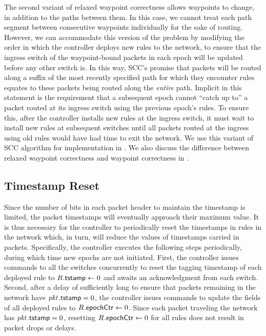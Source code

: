 The second variant of relaxed waypoint correctness allows waypoints to change,
in addition to the paths between them.  In this case,
we cannot treat each path segment between consecutive waypoints
individually for the sake of routing.  However, we can accommodate
this version of the problem by modifying the order in which the
controller deploys new rules to the network, to ensure that the
ingress switch of the waypoint-bound packets in each epoch will be
updated before any other switch is.  In this way, SCC's promise that
packets will be routed along a suffix of the most recently specified path
for which they encounter rules equates to these packets being routed
along the \textit{entire} path.  Implicit in this statement is the
requirement that a subsequent epoch cannot ``catch up to'' a packet
routed at its ingress switch using the previous epoch's rules.  To
ensure this, after the controller installs new rules at the ingress
switch, it must wait to install new rules at subsequent switches until
all packets routed at the ingress using old rules would have had time
to exit the network. We use this variant of SCC algorithm for implementation in . We also discuss the difference between relaxed waypoint correctness and waypoint correctness in .



\subsection{Timestamp Reset}
Since the number of bits in each packet header to maintain the
timestamp \pktID{}{\tagTmpField} is limited, the packet timestamps
will eventually approach their maximum value.  It is thus necessary
for the controller to periodically reset the timestamps in rules in
the network which, in turn, will reduce the values of timestamps
carried in packets.  Specifically, the controller executes the
following steps periodically, during which time new epochs are not
initiated.  First, the controller issues commands to all the switches
concurrently to reset the tagging timestamp  of
each deployed rule  to $\ruleID{}{\tagTmpField} \gets 0$ and
awaits an acknowledgment from each switch.  Second, after a delay of
sufficiently long to ensure that packets \pktID{} remaining in the
network have $\pktID{}{\tagTmpField} = 0$, the controller issues
commands to update the  fields of all deployed
rules  to $\ruleID{}{\epochField} \gets 0$.  Since each
packet \pktID{} traveling the network has $\pktID{}{\tagTmpField} =
0$, resetting $\ruleID{}{\epochField} \gets 0$ for all rules does not
result in packet drops or delays.


